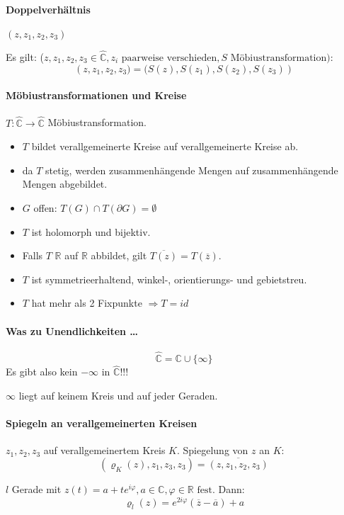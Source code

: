 \documentclass[a4paper, 10pt, DIV20, headings=small]{scrartcl}
\theoremstyle{definition}
\theoremstyle{plain}
\begin{document}
\paragraph{Doppelverhältnis} $(z,z_1,z_2,z_3)$

Es gilt: ($z,z_1,z_2,z_3 \in \widehat{\mathbb{C}}, z_i \text{ paarweise verschieden}, S \text{ Möbiustransformation}):$ 
$$\left(z, z_1 , z_2 , z_3 ) = (S(z), S(z_1 ), S(z_2 ), S(z_3 )\right)$$


\paragraph{Möbiustransformationen und Kreise}
$T \colon \widehat{\mathbb{C}} \rightarrow \widehat{\mathbb{C}}$ Möbiustransformation.
\begin{itemize}
	\item $T$ bildet verallgemeinerte Kreise auf verallgemeinerte Kreise ab.
	\item da $T$ stetig, werden zusammenhängende Mengen auf zusammenhängende Mengen abgebildet.
	\item $G$ offen: $T(G) \cap T(\partial G) = \emptyset$
	\item $T$ ist holomorph und bijektiv.
	\item Falls $T$ $\mathbb{R}$ auf $\mathbb{R}$ abbildet, gilt $\overline{T(z)} = T(\overline{z})$.
	\item $T$ ist symmetrieerhaltend, winkel-, orientierungs- und gebietstreu.
	\item $T$ hat mehr als 2 Fixpunkte $\Rightarrow T = id$
\end{itemize}

\paragraph{Was zu Unendlichkeiten \ldots}
$$\widehat{\mathbb{C}} = \mathbb{C} \cup \{\infty\}$$
Es gibt also kein $- \infty$ in $\widehat{\mathbb{C}}$!!!

$\infty$ liegt auf keinem Kreis und auf jeder Geraden.

\paragraph{Spiegeln an verallgemeinerten Kreisen}
$z_1,z_2,z_3$ auf verallgemeinertem Kreis $K$. Spiegelung von $z$ an $K$:
$$(\varrho_K(z),z_1,z_3,z_3) = \overline{(z,z_1,z_2,z_3)}$$

$l$ Gerade mit $z(t) = a + t e^{i \varphi}, a \in \mathbb{C}, \varphi \in \mathbb{R} \text{ fest}$.
Dann:
$$\varrho_l(z) = e^{2 i \varphi} (\overline{z} - \overline{a}) + a$$
\end{document}
